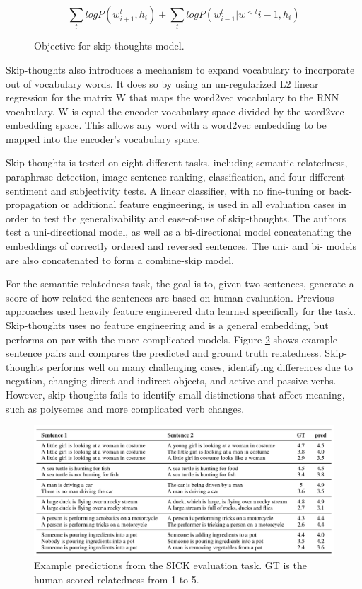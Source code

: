 \begin{figure}
    \centering
    $$
    \sum\limits_{t}logP(w^t_{i+1}, h_i) + \sum\limits_{t}log P (w^t_{i-1}|w^{<t}{i-1}, h_i)
    $$
    \caption{Objective for skip thoughts model.}
    \label{fig:skipthoughts-obj}
\end{figure}

Skip-thoughts also introduces a mechanism to expand vocabulary to incorporate out of vocabulary words. It does so by using an un-regularized L2 linear regression for the matrix W that maps the word2vec vocabulary to the RNN vocabulary. W is equal the encoder vocabulary space divided by the word2vec embedding space. This allows any word with a word2vec embedding to be mapped into the encoder's vocabulary space.

Skip-thoughts is tested on eight different tasks, including semantic relatedness, paraphrase detection, image-sentence ranking, classification, and four different sentiment and subjectivity tests. A linear classifier, with no fine-tuning or back-propagation or additional feature engineering, is used in all evaluation cases in order to test the generalizability and ease-of-use of skip-thoughts. The authors test a uni-directional model, as well as a bi-directional model concatenating the embeddings of correctly ordered and reversed sentences. The uni- and bi- models are also concatenated to form a combine-skip model.

For the semantic relatedness task, the goal is to, given two sentences, generate a score of how related the sentences are based on human evaluation. Previous approaches used heavily feature engineered data learned specifically for the task. Skip-thoughts uses no feature engineering and is a general embedding, but performs on-par with the more complicated models. Figure \ref{fig:skip-thoughts-sr} shows example sentence pairs and compares the predicted and ground truth relatedness. Skip-thoughts performs well on many challenging cases, identifying differences due to negation, changing direct and indirect objects, and active and passive verbs. However, skip-thoughts fails to identify small distinctions that affect meaning, such as polysemes and more complicated verb changes.

\begin{figure}
\centering
  \includegraphics[width=1\linewidth]{files/skipthoughts-5.png}
  \caption{Example predictions from the SICK evaluation task. GT is the human-scored relatedness from 1 to 5.}
  \label{fig:skip-thoughts-sr}
\end{figure}

